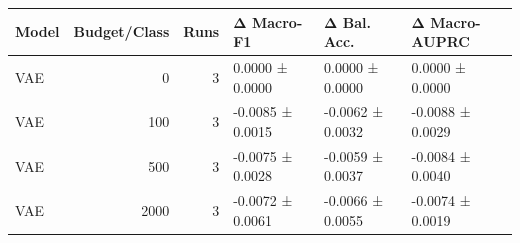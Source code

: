 \begin{tabular}{lrrlll}
\toprule
Model & Budget/Class & Runs & Δ Macro-F1 & Δ Bal. Acc. & Δ Macro-AUPRC \\
\midrule
VAE & 0 & 3 & 0.0000 ± 0.0000 & 0.0000 ± 0.0000 & 0.0000 ± 0.0000 \\
VAE & 100 & 3 & -0.0085 ± 0.0015 & -0.0062 ± 0.0032 & -0.0088 ± 0.0029 \\
VAE & 500 & 3 & -0.0075 ± 0.0028 & -0.0059 ± 0.0037 & -0.0084 ± 0.0040 \\
VAE & 2000 & 3 & -0.0072 ± 0.0061 & -0.0066 ± 0.0055 & -0.0074 ± 0.0019 \\
\bottomrule
\end{tabular}
